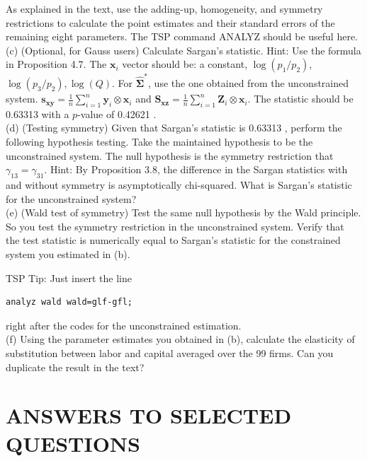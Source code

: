 \documentclass[10pt]{article}
\begin{document}
As explained in the text, use the adding-up, homogeneity, and symmetry restrictions to calculate the point estimates and their standard errors of the remaining eight parameters. The TSP command ANALYZ should be useful here.\\
(c) (Optional, for Gauss users) Calculate Sargan's statistic. Hint: Use the formula in Proposition 4.7. The $\mathbf{x}_{i}$ vector should be: a constant, $\log \left(p_{1} / p_{2}\right)$, $\log \left(p_{3} / p_{2}\right), \log (Q)$. For $\widehat{\mathbf{\Sigma}}^{*}$, use the one obtained from the unconstrained system. $\mathbf{s}_{\mathbf{x y}}=\frac{1}{n} \sum_{i=1}^{n} \mathbf{y}_{i} \otimes \mathbf{x}_{i}$ and $\mathbf{S}_{\mathbf{x z}}=\frac{1}{n} \sum_{i=1}^{n} \mathbf{Z}_{i} \otimes \mathbf{x}_{i}$. The statistic should be 0.63313 with a $p$-value of 0.42621 .\\
(d) (Testing symmetry) Given that Sargan's statistic is 0.63313 , perform the following hypothesis testing. Take the maintained hypothesis to be the unconstrained system. The null hypothesis is the symmetry restriction that $\gamma_{13}=\gamma_{31}$. Hint: By Proposition 3.8, the difference in the Sargan statistics with and without symmetry is asymptotically chi-squared. What is Sargan's statistic for the unconstrained system?\\
(e) (Wald test of symmetry) Test the same null hypothesis by the Wald principle. So you test the symmetry restriction in the unconstrained system. Verify that\\
the test statistic is numerically equal to Sargan's statistic for the constrained system you estimated in (b).

TSP Tip: Just insert the line

\begin{verbatim}
analyz wald wald=glf-gfl;
\end{verbatim}

right after the codes for the unconstrained estimation.\\
(f) Using the parameter estimates you obtained in (b), calculate the elasticity of substitution between labor and capital averaged over the 99 firms. Can you duplicate the result in the text?

\section*{ANSWERS TO SELECTED QUESTIONS}
\end{document}
